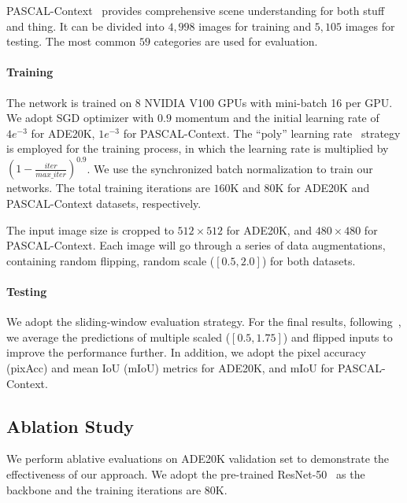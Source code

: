 \documentclass[journal]{IEEEtran}
\begin{document}
PASCAL-Context~\cite{PASCAL-Context} provides comprehensive scene understanding 
for both stuff and thing.
It can be divided into $4,998$ images for training 
and $5,105$ images for testing. 
The most common $59$ categories are used for evaluation.

\paragraph{Training}
The network is trained on 8 NVIDIA V100 GPUs with mini-batch 16 per GPU.
We adopt SGD optimizer with $0.9$ momentum and the initial learning rate of $4e^{-3}$ for ADE20K, $1e^{-3}$ for PASCAL-Context.
The ``poly'' learning rate~\cite{Chen-ECCV-Deeplabv3p-2018, Yu-CVPR-DFN-2018, Yu-CVPR-CPNet-2020} strategy is employed for the training process, 
in which the learning rate is multiplied by $(1 - \frac{iter}{max\_iter})^{0.9}$.
We use the synchronized batch normalization to train our networks.
The total training iterations are $160$K and $80$K for ADE20K and PASCAL-Context datasets, respectively.

The input image size is cropped to $512\times512$ for ADE20K, and $480\times480$ for PASCAL-Context.
Each image will go through a series of data augmentations,
containing random flipping, random scale ($[0.5, 2.0]$) for both datasets.

\paragraph{Testing}
We adopt the sliding-window evaluation strategy.
For the final results,
following~\cite{Zhao-CVPR-PSPNet-2017, Chen-ECCV-Deeplabv3p-2018, Yu-CVPR-CPNet-2020},
we average the predictions of multiple scaled ($[0.5, 1.75]$) and flipped inputs 
to improve the performance further. 
In addition, we adopt the pixel accuracy (pixAcc) and mean IoU (mIoU) metrics for ADE20K, and mIoU for PASCAL-Context.








\subsection{Ablation Study}
We perform ablative evaluations on ADE20K validation set 
to demonstrate the effectiveness of our approach.
We adopt the pre-trained ResNet-50~\cite{He-CVPR-ResNet-2016} as the backbone 
and the training iterations are $80$K.
\end{document}
